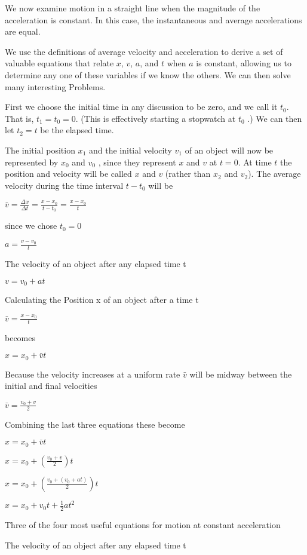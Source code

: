 \documentclass{extarticle}
\begin{document}
We now examine motion in a straight line when the magnitude of the acceleration is constant. In this case, the instantaneous and average accelerations are equal.


We use the definitions of average velocity and acceleration to derive a set of valuable equations that relate $x$, $v$, $a$, and $t$ when $a$ is constant, allowing us to determine any one of these variables if we know the others. We can then solve many interesting Problems.

First we choose the initial time in any discussion to be zero, and we call it $t_0$.
That is,  $t_1 = t_0 = 0$. (This is effectively starting a stopwatch at $t_0$ .)
We can then let $t_2 = t$ be the elapsed time.

The initial position $x_1$ and the initial velocity $v_1$  of an object will now be represented by $x_0$ and $v_0$ , since they represent $x$ and $v$ at $t = 0$.
At time $t$ the position and velocity will be called $x$ and $v$ (rather than $x_2$ and $v_2$).
The average velocity during the time interval $t - t_0$ will be

$\bar{v} = \frac{\Delta x}{\Delta t} = \frac{x - x_0}{t - t_0} = \frac{x - x_0}{t}$

since we chose $t_0 = 0$


$a = \frac{v - v_0}{t}$


The velocity of an object after any elapsed time t

$v = v_0 + at$

Calculating the 
Position x of an object after a time t

$\bar{v} = \frac{x - x_0}{t}$

becomes

$x = x_0 + \bar{v}t$


Because the velocity increases at a uniform rate $\bar{v}$ will be midway between the initial and final velocities

$\bar{v} = \frac{v_0 + v}{2}$


Combining the last three equations these become

$x = x_0 + \bar{v}t$

$x = x_0 + (\frac{v_0 + v}{2})t$

$x = x_0 + (\frac{v_0 + (v_0 + at)}{2})t$

$x = x_0 + v_0t + \frac{1}{2}at^2$



Three of the four most useful equations for motion at constant acceleration 

The velocity of an object after any elapsed time t
\end{document}
